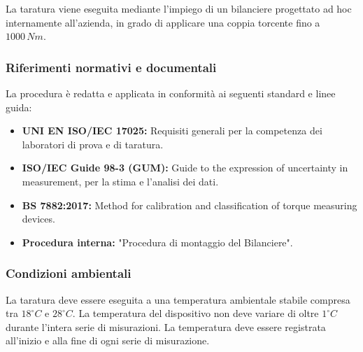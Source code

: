 \documentclass[a4paper, twoside]{article}
\begin{document}
La taratura viene eseguita mediante l'impiego di un bilanciere progettato ad hoc internamente all'azienda, in grado di applicare una coppia torcente fino a $1000\,Nm$.

\subsubsection{Riferimenti normativi e documentali}
La procedura è redatta e applicata in conformità ai seguenti standard e linee guida:
\begin{itemize}
    \item \textbf{UNI EN ISO/IEC 17025:} Requisiti generali per la competenza dei laboratori di prova e di taratura.
    \item \textbf{ISO/IEC Guide 98-3 (GUM):} Guide to the expression of uncertainty in measurement, per la stima e l'analisi dei dati.
    \item \textbf{BS 7882:2017:} Method for calibration and classification of torque measuring devices.
    \item \textbf{Procedura interna:} "Procedura di montaggio del Bilanciere".
\end{itemize}

\subsubsection{Condizioni ambientali}
La taratura deve essere eseguita a una temperatura ambientale stabile compresa tra $18^\circ C$ e $28^\circ C$. La temperatura del dispositivo non deve variare di oltre $1^\circ C$ durante l'intera serie di misurazioni. La temperatura deve essere registrata all'inizio e alla fine di ogni serie di misurazione.
\end{document}
